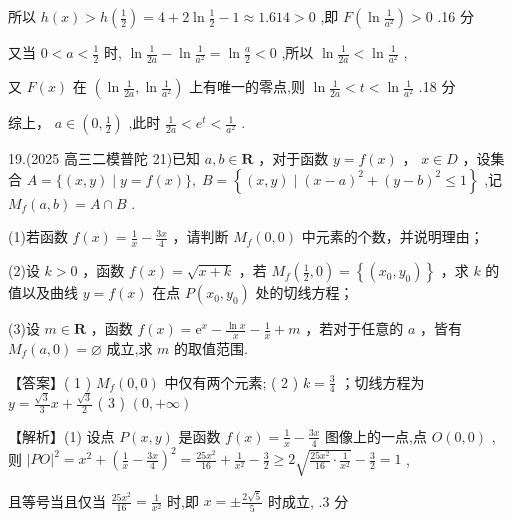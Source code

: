\documentclass[10pt]{article}
\begin{document}
所以 \(h\left( x\right)  > h\left( \frac{1}{2}\right)  = 4 + 2\ln \frac{1}{2} - 1 \approx  {1.614} > 0\) ,即 \(F\left( {\ln \frac{1}{{a}^{2}}}\right)  > 0\) .16 分

又当 \(0 < a < \frac{1}{2}\) 时, \(\ln \frac{1}{2a} - \ln \frac{1}{{a}^{2}} = \ln \frac{a}{2} < 0\) ,所以 \(\ln \frac{1}{2a} < \ln \frac{1}{{a}^{2}}\) ,

又 \(F\left( x\right)\) 在 \(\left( {\ln \frac{1}{2a},\ln \frac{1}{{a}^{2}}}\right)\) 上有唯一的零点,则 \(\ln \frac{1}{2a} < t < \ln \frac{1}{{a}^{2}}\) .18 分

综上， \(a \in  \left( {0,\frac{1}{2}}\right)\) ,此时 \(\frac{1}{2a} < {e}^{t} < \frac{1}{{a}^{2}}\) .

19.(2025 高三二模普陀 21)已知 \(a,b \in  \mathbf{R}\) ，对于函数 \(y = f\left( x\right)\) ， \(x \in  D\) ，设集合 \(A = \{ \left( {x,y}\right)  \mid  y = f\left( x\right) \} , \; B = \left\{  {\left( {x,y}\right)  \mid  {\left( x - a\right) }^{2} + {\left( y - b\right) }^{2} \leq  1}\right\}\) ,记 \({M}_{f}\left( {a,b}\right)  = A \cap  B\) .

(1)若函数 \(f\left( x\right)  = \frac{1}{x} - \frac{3x}{4}\) ，请判断 \({M}_{f}\left( {0,0}\right)\) 中元素的个数，并说明理由；

(2)设 \(k > 0\) ，函数 \(f\left( x\right)  = \sqrt{x + k}\) ，若 \({M}_{f}\left( {\frac{1}{2},0}\right)  = \left\{  \left( {{x}_{0},{y}_{0}}\right) \right\}\) ，求 \(k\) 的值以及曲线 \(y = f\left( x\right)\) 在点 \(P\left( {{x}_{0},{y}_{0}}\right)\) 处的切线方程；

(3)设 \(m \in  \mathbf{R}\) ，函数 \(f\left( x\right)  = {\mathrm{e}}^{x} - \frac{\ln x}{x} - \frac{1}{x} + m\) ，若对于任意的 \(a\) ，皆有 \({M}_{f}\left( {a,0}\right)  = \varnothing\) 成立,求 \(m\) 的取值范围.

【答案】( 1 ) \({M}_{f}\left( {0,0}\right)\) 中仅有两个元素; ( 2 ) \(k = \frac{3}{4}\) ；切线方程为 \(y = \frac{\sqrt{3}}{3}x + \frac{\sqrt{3}}{2}\) ( 3 ) \(\left( {0, + \infty }\right)\)

【解析】(1) 设点 \(P\left( {x,y}\right)\) 是函数 \(f\left( x\right)  = \frac{1}{x} - \frac{3x}{4}\) 图像上的一点,点 \(O\left( {0,0}\right)\) , 则 \({\left| PO\right| }^{2} = {x}^{2} + {\left( \frac{1}{x} - \frac{3x}{4}\right) }^{2} = \frac{{25}{x}^{2}}{16} + \frac{1}{{x}^{2}} - \frac{3}{2} \geq  2\sqrt{\frac{{25}{x}^{2}}{16} \cdot  \frac{1}{{x}^{2}}} - \frac{3}{2} = 1\) ,

且等号当且仅当 \(\frac{{25}{x}^{2}}{16} = \frac{1}{{x}^{2}}\) 时,即 \(x =  \pm  \frac{2\sqrt{5}}{5}\) 时成立, .3 分
\end{document}
